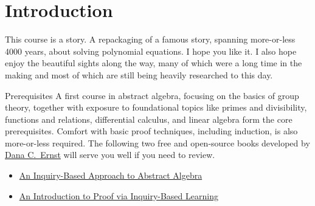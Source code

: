 \chapter{Introduction}

This course is a story. A repackaging of a famous story, spanning more-or-less 4000 years, about solving polynomial equations. I hope you like it. I also hope enjoy the beautiful sights along the way, many of which were a long time in the making and most of which are still being heavily researched to this day.

\begin{section}{Prerequisites}
A first course in abstract algebra, focusing on the basics of group theory, together with exposure to foundational topics like primes and divisibility, functions and relations, differential calculus, and linear algebra form the core prerequisites. Comfort with basic proof techniques, including induction, is also more-or-less required. The following two free and open-source books developed by \href{https://danaernst.com}{Dana C.~Ernst} will serve you well if you need to review.
\begin{itemize}
\item \href{https://github.com/dcernst/IBL-AbstractAlgebra/blob/master/Spring2018/IBL-AbstractAlgebra.pdf}{An Inquiry-Based Approach to Abstract Algebra}
\item \href{https://github.com/dcernst/IBL-IntroToProof/blob/master/IntroToProof.pdf}{An Introduction to Proof via Inquiry-Based Learning}
\end{itemize}
\end{section}

